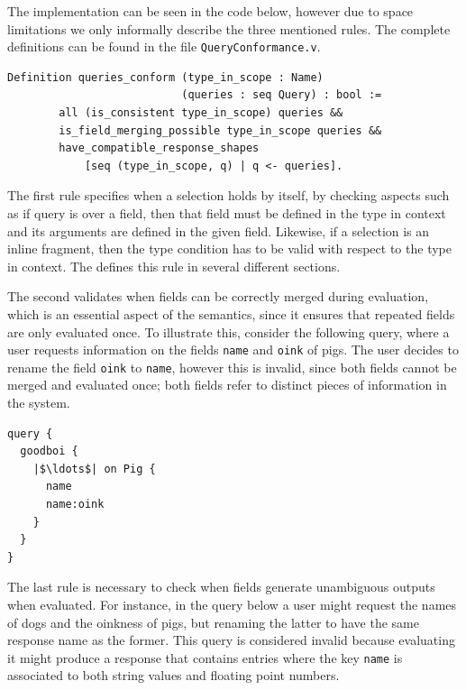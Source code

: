 The implementation can be seen in the code below, however due to space limitations we only informally describe the three mentioned rules. The complete definitions can be found in the file \texttt{QueryConformance.v}.

\begin{verbatim}
Definition queries_conform (type_in_scope : Name)
                           (queries : seq Query) : bool :=
        all (is_consistent type_in_scope) queries &&
        is_field_merging_possible type_in_scope queries &&
        have_compatible_response_shapes
            [seq (type_in_scope, q) | q <- queries].
\end{verbatim}



The first rule specifies when a selection holds by itself, by checking aspects such as if query is over a field, then that field must be defined in the  type in context and its arguments are defined in the given field. Likewise, if a selection is an inline fragment, then the type condition has to be valid with respect to the type in context. The \spec{} defines this rule in several different sections.

The second validates when fields can be correctly merged during evaluation, which is an essential aspect of the semantics, since it ensures that repeated fields are only evaluated once. To illustrate this, consider the following query, where a user requests information on the fields \texttt{name} and \texttt{oink} of pigs. The user decides to rename the field \texttt{oink} to \texttt{name}, however this is invalid, since both fields cannot be merged and evaluated once; both fields refer to distinct pieces of information in the system.

\begin{verbatim}
query {
  goodboi {
    |$\ldots$| on Pig {
	  name
	  name:oink
    }
  }
}
\end{verbatim}

The last rule is necessary to check when fields generate unambiguous outputs when evaluated. For instance, in the query below a user might request the names of dogs and the oinkness of pigs, but renaming the latter to have the same response name as the former. This query is considered invalid because evaluating it might produce a response that contains entries where the key \texttt{name} is associated to both string values and floating point numbers. 

